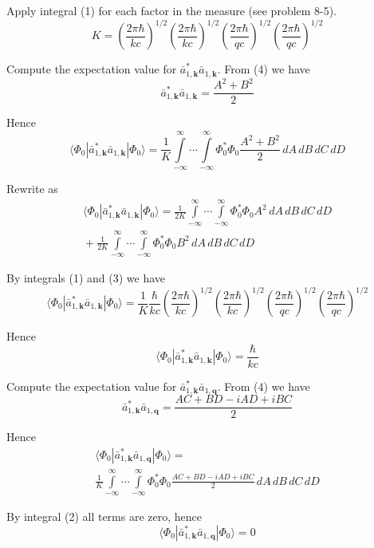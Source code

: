 \documentclass[12pt]{article}
\begin{document}
Apply integral (1) for each factor in the measure (see problem 8-5).
\begin{equation*}
K=
\left(\frac{2\pi\hbar}{kc}\right)^{1/2}
\left(\frac{2\pi\hbar}{kc}\right)^{1/2}
\left(\frac{2\pi\hbar}{qc}\right)^{1/2}
\left(\frac{2\pi\hbar}{qc}\right)^{1/2}
\end{equation*}

Compute the expectation value for $\bar a_{1,\mathbf k}^*\bar a_{1,\mathbf k}$.
From (4) we have
\begin{equation*}
\bar a_{1,\mathbf k}^*\bar a_{1,\mathbf k}=\frac{A^2+B^2}{2}
\end{equation*}

Hence
\begin{equation*}
\langle\Phi_0|\bar a_{1,\mathbf k}^*\bar a_{1,\mathbf k}|\Phi_0\rangle
=\frac{1}{K}\int\limits_{-\infty}^\infty\cdots\int\limits_{-\infty}^\infty
\Phi_0^*\Phi_0
\frac{A^2+B^2}{2}
\,dA\,dB\,dC\,dD
\end{equation*}

Rewrite as
\begin{multline*}
\langle\Phi_0|\bar a_{1,\mathbf k}^*\bar a_{1,\mathbf k}|\Phi_0\rangle
=\frac{1}{2K}
\int\limits_{-\infty}^\infty\cdots\int\limits_{-\infty}^\infty
\Phi_0^*\Phi_0
A^2
\,dA\,dB\,dC\,dD
\\{}+
\frac{1}{2K}
\int\limits_{-\infty}^\infty\cdots\int\limits_{-\infty}^\infty
\Phi_0^*\Phi_0
B^2
\,dA\,dB\,dC\,dD
\end{multline*}

By integrals (1) and (3) we have
\begin{equation*}
\langle\Phi_0|\bar a_{1,\mathbf k}^*\bar a_{1,\mathbf k}|\Phi_0\rangle
=\frac{1}{K}\frac{\hbar}{kc}\left(\frac{2\pi\hbar}{kc}\right)^{1/2}
\left(\frac{2\pi\hbar}{kc}\right)^{1/2}
\left(\frac{2\pi\hbar}{qc}\right)^{1/2}
\left(\frac{2\pi\hbar}{qc}\right)^{1/2}
\end{equation*}

Hence
\begin{equation*}
\langle\Phi_0|\bar a_{1,\mathbf k}^*\bar a_{1,\mathbf k}|\Phi_0\rangle=\frac{\hbar}{kc}
\tag{5}
\end{equation*}

Compute the expectation value for $\bar a_{1,\mathbf k}^*\bar a_{1,\mathbf q}$.
From (4) we have
\begin{equation*}
\bar a_{1,\mathbf k}^*\bar a_{1,\mathbf q}
=\frac{AC+BD-iAD+iBC}{2}
\end{equation*}

Hence
\begin{multline*}
\langle\Phi_0|\bar a_{1,\mathbf k}^*\bar a_{1,\mathbf q}|\Phi_0\rangle=
\\
\frac{1}{K}\int\limits_{-\infty}^\infty\cdots\int\limits_{-\infty}^\infty
\Phi_0^*\Phi_0
\frac{AC+BD-iAD+iBC}{2}
\,dA\,dB\,dC\,dD
\end{multline*}

By integral (2) all terms are zero, hence
\begin{equation*}
\langle\Phi_0|\bar a_{1,\mathbf k}^*\bar a_{1,\mathbf q}|\Phi_0\rangle=0
\tag{6}
\end{equation*}
\end{document}
